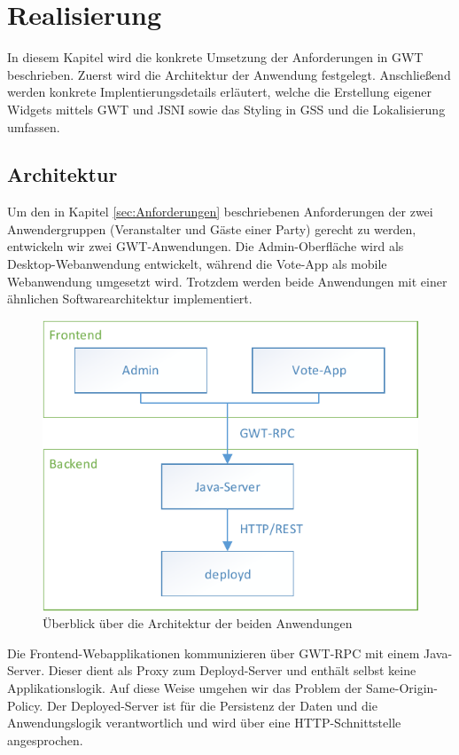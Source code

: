 \section{Realisierung}

In diesem Kapitel wird die konkrete Umsetzung der Anforderungen in GWT beschrieben.
Zuerst wird die Architektur der Anwendung festgelegt. Anschließend werden konkrete
Implentierungsdetails erläutert, welche die Erstellung eigener Widgets mittels GWT und
JSNI sowie das Styling in GSS und die Lokalisierung umfassen.

\subsection{Architektur}
Um den in Kapitel \ref{sec:Anforderungen} beschriebenen Anforderungen der zwei Anwendergruppen (Veranstalter und Gäste einer Party) gerecht zu werden, entwickeln wir zwei GWT-Anwendungen. Die Admin-Oberfläche wird als Desktop-Webanwendung
entwickelt, während die Vote-App als mobile Webanwendung umgesetzt wird. Trotzdem werden beide Anwendungen mit einer ähnlichen Softwarearchitektur implementiert.

\begin{figure}[tbh]
\centering
\includegraphics[width=0.7\linewidth]{Bilder/Architektur-Ueberblick}
\caption{Überblick über die Architektur der beiden Anwendungen}
\label{fig:Architektur-Ueberblick}
\end{figure}


Die Frontend-Webapplikationen kommunizieren über GWT-RPC mit einem Java-Server. Dieser dient als 
Proxy zum Deployd-Server und enthält selbst keine Applikationslogik. Auf diese Weise umgehen wir das Problem der Same-Origin-Policy. Der Deployed-Server ist für die Persistenz der Daten und die Anwendungslogik verantwortlich und wird über eine HTTP-Schnittstelle angesprochen.

